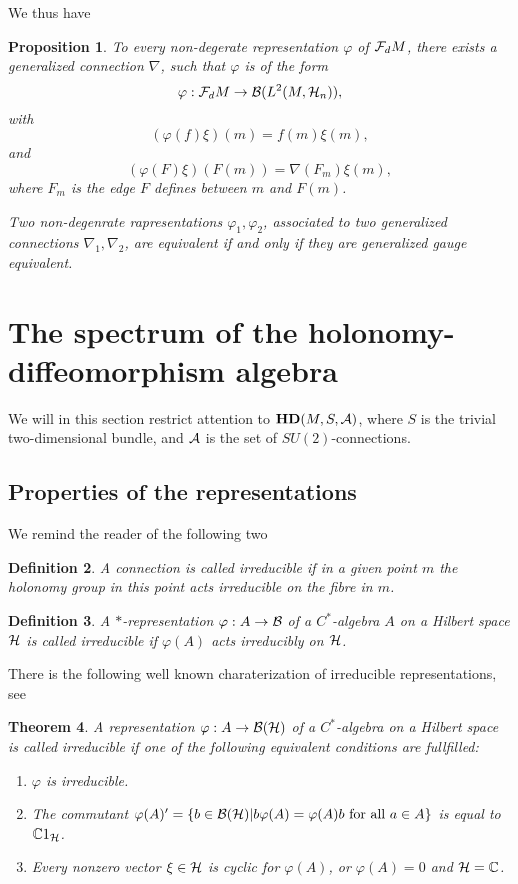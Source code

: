 \documentclass[12pt]{article}
\def\ca{{\cal A}}
\def\cb{{\cal B}}
\def\cf{{\cal F}}
\def\ch{{\cal H}}
\newtheorem{thm}{Theorem}[subsection]
\newtheorem{definition}[thm]{Definition}
\newtheorem{proposition}[thm]{Proposition}
\newcommand{\bbC}{{\Bbb C}}
\begin{document}
We thus have
\begin{proposition}
To every non-degerate representation $\varphi$ of $\cf_d M$, there exists a generalized connection $\nabla$, such that $\varphi$  is of the form 
$$\varphi : \cf_dM  \to \cb (L^2 (M,\ch_n)) ,$$
with
$$(\varphi (f) \xi ) (m)=f(m)\xi (m) , $$
and 
$$(\varphi (F) \xi ) ( F(m))=\nabla (F_m) \xi (m) ,  $$
where $F_m$ is the edge $F$ defines between $m$ and $F(m)$.


Two non-degenrate rapresentations $\varphi_1, \varphi_2$, associated to two generalized connections $\nabla_1,\nabla_2$, are equivalent if and only if they are generalized gauge equivalent. 
\end{proposition}


\section{The spectrum of the holonomy-diffeomorphism algebra}

We will in this section restrict attention to $\mathbf{H D} (M,S,\ca)$, where $S$ is the trivial two-dimensional bundle, and $\ca$ is the set of $SU(2)$-connections.  

\subsection{Properties of the representations}

We remind the reader of the following two 
\begin{definition}
A connection is called irreducible if in a given point $m$ the holonomy group in this point  acts irreducible on the fibre in $m$. 
\end{definition}

\begin{definition}
A $*$-representation $\varphi :A \to \cb $ of a $C^*$-algebra $A$ on a Hilbert space $\ch$ is called irreducible if $\varphi (A)$ acts irreducibly on $\ch$.
\end{definition}

There is the following well known charaterization of irreducible representations, see \cite{BratteliRobinson}

\begin{thm}
A representation $\varphi: A\to \cb (\ch)$ of a $C^*$-algebra on a Hilbert space is called irreducible if one of the following equivalent conditions are fullfilled:
\begin{enumerate}
\item $\varphi $ is irreducible.
\item The commutant $\varphi (A)'=\{ b\in \cb (\ch)| b\varphi (A)=\varphi (A)b \hbox{ for all }a\in A\}$ is equal to $\bbC 1_\ch$.
\item Every nonzero vector $\xi \in \ch$ is cyclic for $\varphi (A)$, or $\varphi (A)=0$ and $\ch =\bbC$. 
\end{enumerate}
\end{thm}
\end{document}
